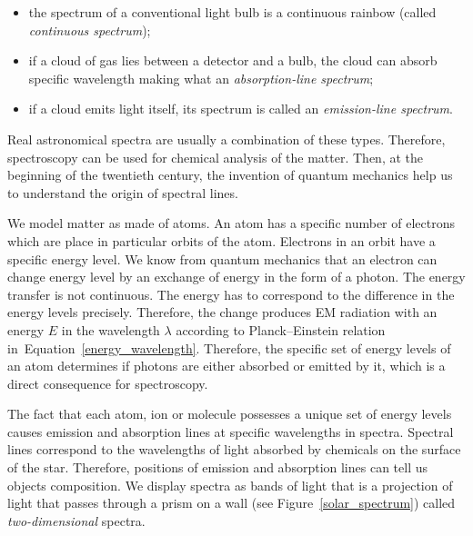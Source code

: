 \begin{itemize}
	\item the spectrum of a conventional light bulb is a continuous rainbow (called \textit{continuous spectrum});
	\item if a cloud of gas lies between a detector and a bulb,
		the cloud can absorb specific wavelength making what an \textit{absorption-line spectrum};
	\item if a cloud emits light itself, its spectrum is called an \textit{emission-line spectrum}.
\end{itemize}

Real astronomical spectra are usually a combination of these types.
Therefore, spectroscopy can be used for chemical analysis of the matter.
Then, at the beginning of the twentieth century,
the invention of quantum mechanics help us to understand the origin of spectral lines.

We model matter as made of atoms.
An atom has a specific number of electrons which are place in particular orbits of the atom.
Electrons in an orbit have a specific energy level.
We know from quantum mechanics that an electron can change energy level by an exchange of energy in the form of a photon.
The energy transfer is not continuous.
The energy has to correspond to the difference in the energy levels precisely.
Therefore, the change produces EM radiation with an energy \(E\) in the wavelength \(\lambda\)
according to Planck--Einstein relation in~Equation~\ref{energy_wavelength}.
Therefore, the specific set of energy levels of an atom determines
if photons are either absorbed or emitted by it,
which is a direct consequence for spectroscopy.~\cite{cochard2018}

The fact that each atom, ion or molecule possesses a unique set of energy levels
causes emission and absorption lines at specific wavelengths in spectra.
Spectral lines correspond to the wavelengths of light absorbed by chemicals on the surface of the star.
Therefore, positions of emission and absorption lines can tell us objects composition.
We display spectra as bands of light that is a projection of light
that passes through a prism on a wall (see Figure~\ref{solar_spectrum})
called \textit{two-dimensional} spectra.~\cite{cochard2018}

